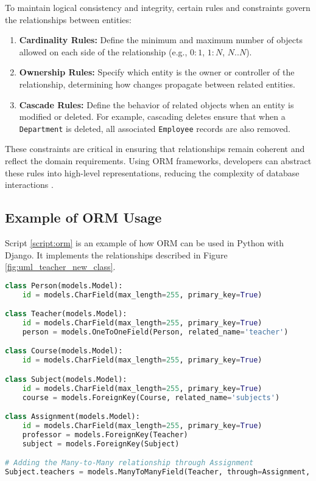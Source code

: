 To maintain logical consistency and integrity, certain rules and constraints govern the relationships between entities:
\begin{enumerate}
    \item \textbf{Cardinality Rules:} Define the minimum and maximum number of objects allowed on each side of the relationship (e.g., \(0:1\), \(1:N\), \(N..N\)).
    \item \textbf{Ownership Rules:} Specify which entity is the owner or controller of the relationship, determining how changes propagate between related entities.
    \item \textbf{Cascade Rules:} Define the behavior of related objects when an entity is modified or deleted. For example, cascading deletes ensure that when a \texttt{Department} is deleted, all associated \texttt{Employee} records are also removed.
\end{enumerate}

These constraints are critical in ensuring that relationships remain coherent and reflect the domain requirements. Using ORM frameworks, developers can abstract these rules into high-level representations, reducing the complexity of database interactions \cite{larman2004applying}.


\subsection{Example of ORM Usage}
Script \ref{script:orm} is an example of how ORM can be used in Python with Django. It implements the relationships described in Figure \ref{fig:uml_teacher_new_class}.


\begin{lstlisting}[language=Python, caption={Example of ORM usage in Python with Django.}, label={script:orm}]
class Person(models.Model):
    id = models.CharField(max_length=255, primary_key=True)

class Teacher(models.Model):
    id = models.CharField(max_length=255, primary_key=True)
    person = models.OneToOneField(Person, related_name='teacher')

class Course(models.Model):
    id = models.CharField(max_length=255, primary_key=True)

class Subject(models.Model):
    id = models.CharField(max_length=255, primary_key=True)
    course = models.ForeignKey(Course, related_name='subjects')

class Assignment(models.Model):
    id = models.CharField(max_length=255, primary_key=True)
    professor = models.ForeignKey(Teacher)
    subject = models.ForeignKey(Subject)

# Adding the Many-to-Many relationship through Assignment
Subject.teachers = models.ManyToManyField(Teacher, through=Assignment, related_name='subjects')

\end{lstlisting}

